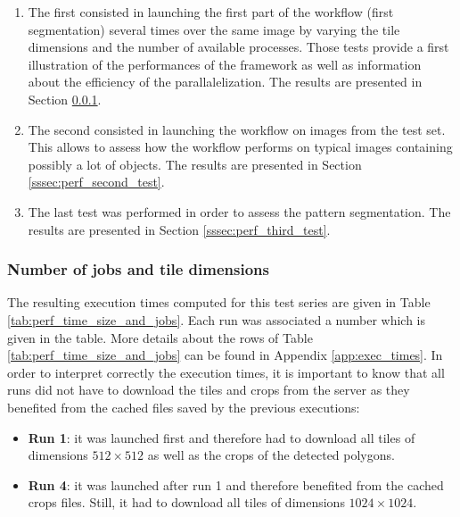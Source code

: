 \begin{enumerate}
	\item The first consisted in launching the first part of the workflow (first segmentation) several times over the same image by varying the tile dimensions and the number of available processes. Those tests provide a first illustration of the performances of the framework as well as information about the efficiency of the parallalelization. The results are presented in Section \ref{sssec:perf_first_test_serie}.
	\item The second consisted in launching the workflow on images from the test set. This allows to assess how the workflow performs on typical images containing possibly a lot of objects. The results are presented in Section \ref{sssec:perf_second_test}.
	\item The last test was performed in order to assess the pattern segmentation. The results are presented in Section \ref{sssec:perf_third_test}.
\end{enumerate} 

\subsubsection{Number of jobs and tile dimensions}
\label{sssec:perf_first_test_serie}
The resulting execution times computed for this test series are given in Table \ref{tab:perf_time_size_and_jobs}. Each run was associated a number which is given in the table. More details about the rows of Table \ref{tab:perf_time_size_and_jobs} can be found in Appendix \ref{app:exec_times}. In order to interpret correctly the execution times, it is important to know that all runs did not have to download the tiles and crops from the server as they benefited from the cached files saved by the previous executions: 

\begin{itemize}
	\item \textbf{Run 1}: it was launched first and therefore had to download all tiles of dimensions $512\times 512$ as well as the crops of the detected polygons.
	\item \textbf{Run 4}: it was launched after run 1 and therefore benefited from the cached crops files. Still, it had to download all tiles of dimensions $1024\times 1024$.
\end{itemize}

